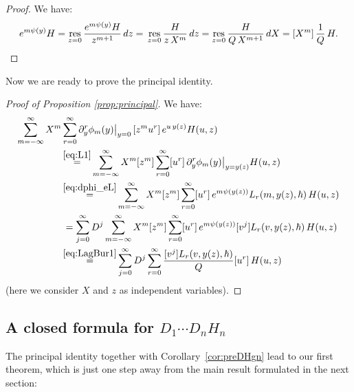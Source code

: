 \documentclass[JEP,XML,SOM,Unicode,NoEqCountersInSection,NoFloatCountersInSection]{cedram}
\theoremstyle{plain}
\theoremstyle{definition}
\theoremstyle{remark}
\newcommand{\res}{\mathop{\rm res}}
\begin{document}
\begin{proof} We have:
\begin{equation*}
[z^m] e^{m\psi(y)} H =
\res_{z=0} \frac{e^{m\psi(y)} H}{z^{m+1}}\,dz=\\
\res_{z=0} \frac{H}{z\,X^{m}}\,dz=
\res_{z=0} \frac{H}{Q\,X^{m+1}}\,dX= [X^m] \,\frac{1}{Q}\,H.\qedhere
\end{equation*}
\end{proof}

Now we are ready to prove the principal identity.

\begin{proof}[Proof of Proposition \ref{prop:principal}] We have:
\begin{align*}
\sum_{m=-\infty}^\infty X^{m}&\sum_{r=0}^\infty
\partial_y^{r}\phi_{m}(y)\big|_{y=0}\,[z^mu^r]\,
e^{u\,y(z)}H(u,z)
\\
&\mathop{=}^{\eqref{eq:L1}}
\sum_{m=-\infty}^\infty X^m[z^m]\sum_{r=0}^\infty [u^r]\,\partial_y^r\phi_m(y)\big|_{y=y(z)}H(u,z)
\\
&\mathop{=}^{\eqref{eq:dphi_eL}}\sum_{m=-\infty}^\infty X^m[z^m]\sum_{r=0}^\infty [u^r]\,
e^{m \psi(y(z))}L_r(m,y(z),\hbar)\,H(u,z)
\\
&\,=\sum_{j=0}^\infty D^j\sum_{m=-\infty}^\infty X^m[z^m]\sum_{r=0}^\infty [u^r]\,
e^{m \psi(y(z))}[v^j]L_r(v,y(z),\hbar)\,H(u,z)
\\
&\mathop{=}^{\eqref{eq:LagBur1}}\sum_{j=0}^\infty D^j\sum_{r=0}^\infty
\frac{[v^j]L_r(v,y(z),\hbar)}{Q}[u^r]\,H(u,z)
\end{align*}
(here we consider $X$ and $z$ as independent variables).
\end{proof}

\subsection{A closed formula for \texorpdfstring{$D_1\cdots D_n H_n$}{D1...DnHn}}

The principal identity together with Corollary~\ref{cor:preDHgn} lead to our first theorem, which is just one step away from the main result formulated in the next section:
\end{document}
